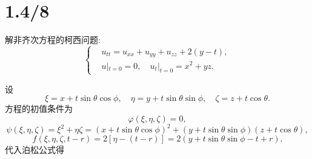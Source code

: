 \documentclass[11pt,a4paper]{article}
\begin{document}
\section{1.4/8}
\begin{problem}
解非齐次方程的柯西问题:
$$\left\{
  \begin{aligned}
     & u_{tt}=u_{xx}+u_{yy}+u_{zz}+2(y-t), \\
     & u|_{t=0}=0,\quad u_t|_{t=0}=x^2+yz.
  \end{aligned}
  \right.$$
\end{problem}
设
$$\xi=x+t\sin\theta\cos\phi,\quad \eta=y+t\sin\theta\sin\phi,\quad \zeta=z+t\cos\theta.$$
方程的初值条件为
$$\varphi(\xi,\eta,\zeta)=0,$$
$$\psi(\xi,\eta,\zeta)=\xi^2+\eta\zeta=(x+t\sin\theta\cos\phi)^2+(y+t\sin\theta\sin\phi)(z+t\cos\theta),$$
$$f(\xi,\eta,\zeta,t-r)=2[\eta-(t-r)]=2(y+t\sin\theta\sin\phi-t+r).$$
代入泊松公式得
\end{document}
